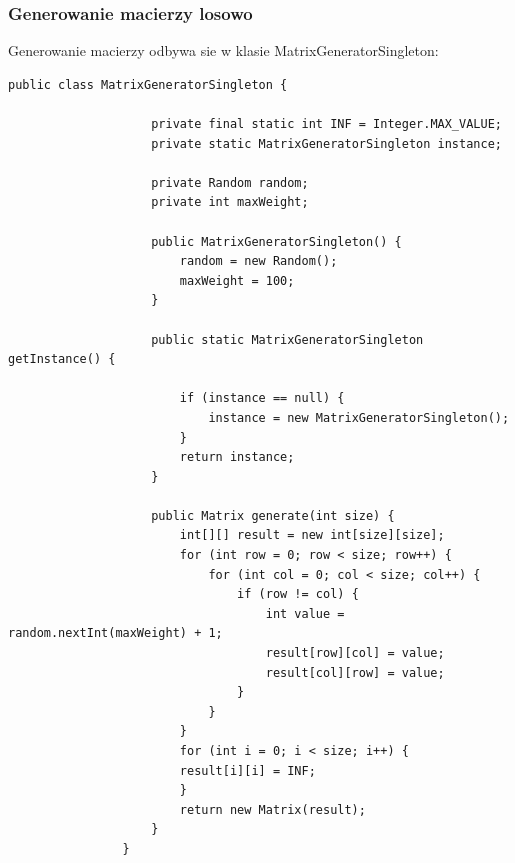 \documentclass{article}
\begin{document}
		\subsubsection{Generowanie macierzy losowo}
			Generowanie macierzy odbywa sie w klasie MatrixGeneratorSingleton:
			\begin{lstlisting}[xleftmargin=-150pt]
				public class MatrixGeneratorSingleton {
				
					private final static int INF = Integer.MAX_VALUE;
					private static MatrixGeneratorSingleton instance;
					
					private Random random;
					private int maxWeight;
					
					public MatrixGeneratorSingleton() {
						random = new Random();
						maxWeight = 100;
					}
										
					public static MatrixGeneratorSingleton getInstance() {
					
						if (instance == null) {
							instance = new MatrixGeneratorSingleton();
						}
						return instance;
					}
					
					public Matrix generate(int size) {
						int[][] result = new int[size][size];
						for (int row = 0; row < size; row++) {
							for (int col = 0; col < size; col++) {
								if (row != col) {
									int value = random.nextInt(maxWeight) + 1;
									result[row][col] = value;
									result[col][row] = value;
								}
							}
						}
						for (int i = 0; i < size; i++) {
						result[i][i] = INF;
						}
						return new Matrix(result);
					}
				}
			\end{lstlisting}	
		
\end{document}
